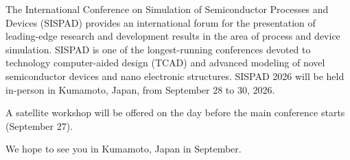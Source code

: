 The International Conference on Simulation of Semiconductor Processes and Devices (SISPAD) \cite{b1} provides an international forum for the presentation of leading-edge research and development results in the area of process and device simulation. SISPAD is one of the longest-running conferences devoted to technology computer-aided design (TCAD) and advanced modeling of novel semiconductor devices and nano electronic structures. SISPAD 2026 will be held in-person in Kumamoto, Japan, from September 28 to 30, 2026.

A satellite workshop will be offered on the day before the main conference starts (September 27).

We hope to see you in Kumamoto, Japan in September.